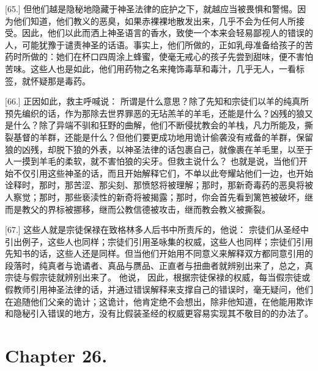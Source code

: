 [65.] 但他们越是隐秘地隐藏于神圣法律的庇护之下，就越应当被畏惧和警惕。因为他们知道，他们教义的恶臭，如果赤裸裸地散发出来，几乎不会为任何人所接受。因此，他们以此而洒上神圣语言的香水，致使一个本来会轻易鄙视人的错误的人，可能犹豫于谴责神圣的话语。事实上，他们所做的，正如乳母准备给孩子的苦药时所做的：她们在杯口四周涂上蜂蜜，使毫无戒心的孩子先尝到甜味，便不害怕苦味。这些人也是如此，他们用药物之名来掩饰毒草和毒汁，几乎无人，一看标签，就怀疑那是毒药。\par

[66.] 正因如此，救主呼喊说：  所谓是什么意思？除了先知和宗徒们以羊的纯真所预先编织的话，作为那除去世界罪恶的无玷羔羊的羊毛，还能是什么？凶残的狼又是什么？除了异端不驯和狂野的曲解，他们不断侵扰教会的羊栈，凡力所能及，撕裂基督的羊群，还能是什么？但他们要更成功地用诡计偷袭没有戒备的羊群，保留狼的凶残，却脱下狼的外表，以神圣法律的话包裹自己，就像裹在羊毛里，以至于人一摸到羊毛的柔软，就不害怕狼的尖牙。但救主说什么？ 也就是说，当他们开始不仅引用这些神圣的话，而且开始解释它们，不单以此夸耀站他们一边，也开始诠释时，那时，那苦涩、那尖刻、那愤怒将被理解；那时，那新奇毒药的恶臭将被人察觉；那时，那些亵渎性的新奇将被揭露；那时，你会首先看到篱笆被破坏，继而是教父的界标被挪移，继而公教信德被攻击，继而教会教义被撕裂。\par

[67.] 这些人就是宗徒保禄在致格林多人后书中所责斥的，他说：  宗徒们从圣经中引出例子，这些人也同样；宗徒们引用圣咏集的权威，这些人也同样；宗徒们引用先知书的话，这些人还是同样。但当他们开始用不同意义来解释双方都同意引用的段落时，纯真者与诡谲者、真品与赝品、正直者与扭曲者就辨别出来了，总之，真宗徒与假宗徒就辨别出来了。 他说， 因此，根据宗徒保禄的权威，每当假宗徒或假教师引用神圣法律的话，并通过错误解释来支撑自己的错误时，毫无疑问，他们在追随他们父亲的诡计；这诡计，他肯定绝不会想出，除非他知道，在他能用欺诈和隐秘引入错误的地方，没有比假装圣经的权威更容易实现其不敬目的的办法了。\par


\section{Chapter 26.}


